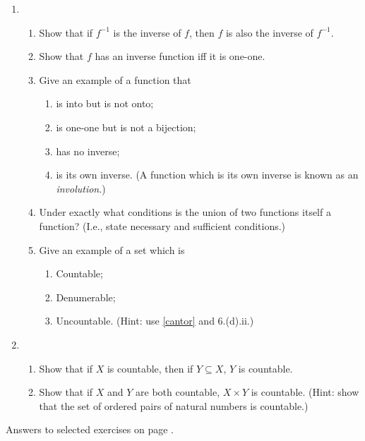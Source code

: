 {\begin{enumerate}
\item \begin{enumerate}
\item Show that if $f^{-1}$ is the inverse of $f$, then $f$ is also the inverse of $f^{-1}$.
	\item Show that $f$ has an inverse function iff it is one-one.
	\item Give an example of a function that \begin{enumerate}
		\item is into but is not onto;
		\item is one-one but is not a bijection;
		\item has no inverse;
		\item is its own inverse. (A function which is its own inverse is known as an \emph{involution}.)
	\end{enumerate}
	\item Under exactly what conditions is the union of two functions itself a function? (I.e., state necessary and sufficient conditions.)
	\item Give an example of a set which is \begin{enumerate}
		\item Countable;
		\item Denumerable;
		\item Uncountable. (Hint: use \autoref{cantor} and 6.(d).ii.)
	\end{enumerate} 
\end{enumerate} 



\item \begin{enumerate}
	\item Show that if $X$ is countable, then if $Y \subseteq X$, $Y$ is countable.
\item Show that if $X$ and $Y$ are both countable, $X \times Y$ is countable. (Hint: show that the set of ordered pairs of natural numbers is countable.)

\end{enumerate}





\end{enumerate}

Answers to selected exercises on page \pageref{ans:sets}.
}

